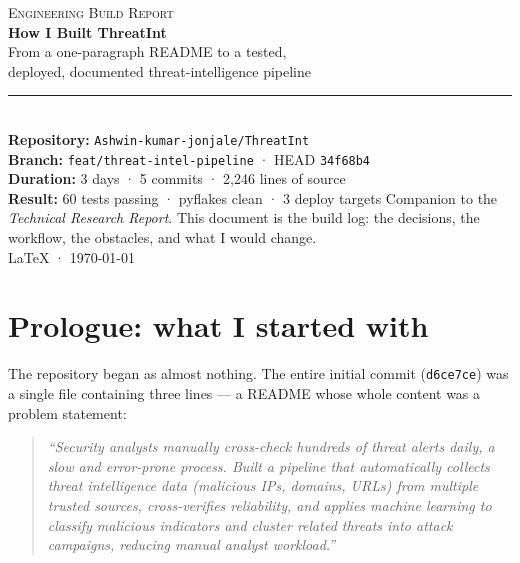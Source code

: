 \documentclass[11pt,a4paper]{article}
\begin{document}
\begin{titlepage}
\pagecolor{purple}
\color{white}
\centering
\vspace*{3.2cm}
{\fontsize{15}{18}\selectfont\color{white!80}\textsc{Engineering Build Report}}\\[0.8cm]
{\fontsize{40}{46}\selectfont\bfseries How I Built ThreatInt}\\[0.5cm]
{\fontsize{16}{20}\selectfont\color{white!88}
From a one-paragraph README to a tested,\\ deployed, documented threat-intelligence pipeline}\\[2.2cm]
\rule{11cm}{0.6pt}\\[0.8cm]
{\fontsize{12}{15}\selectfont\color{white!85}
\textbf{Repository:} \texttt{Ashwin-kumar-jonjale/ThreatInt}\\[0.3cm]
\textbf{Branch:} \texttt{feat/threat-intel-pipeline} · HEAD \texttt{34f68b4}\\[0.3cm]
\textbf{Duration:} 3 days · 5 commits · 2{,}246 lines of source\\[0.3cm]
\textbf{Result:} 60 tests passing · pyflakes clean · 3 deploy targets}
\vfill
{\fontsize{10}{13}\selectfont\color{white!65}
Companion to the \emph{Technical Research Report}. This document is the build
log: the decisions, the workflow, the obstacles, and what I would change.\\[0.4cm]
\LaTeX{} · \today}
\end{titlepage}
\pagecolor{white}
\color{ink}

\tableofcontents
\newpage
{}

\section{Prologue: what I started with}

The repository began as almost nothing. The entire initial commit
(\texttt{d6ce7ce}) was a single file containing three lines --- a README whose
whole content was a problem statement:

\begin{quote}\itshape
``Security analysts manually cross-check hundreds of threat alerts daily, a slow
and error-prone process. Built a pipeline that automatically collects threat
intelligence data (malicious IPs, domains, URLs) from multiple trusted sources,
cross-verifies reliability, and applies machine learning to classify malicious
indicators and cluster related threats into attack campaigns, reducing manual
analyst workload.''
\end{quote}
\end{document}
